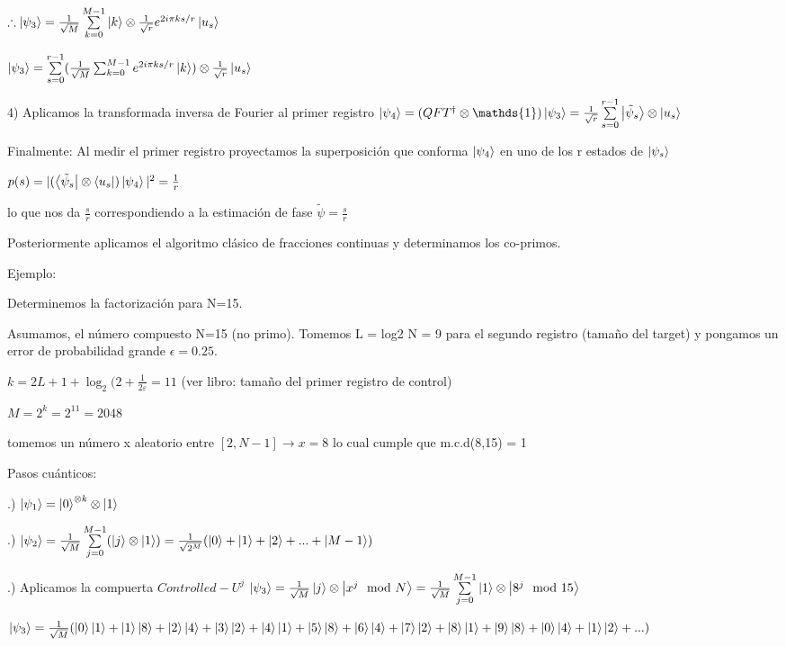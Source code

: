 $\therefore \ket{\psi_3} = \frac{1}{\sqrt{M}} \sum\limits_{k=0}^{M-1} \ket{k} \otimes \frac{1}{\sqrt{r}} e^{2 i \pi k s/r} \ket{u_s}$

$\ket{\psi_3} = \sum\limits_{s=0}^{r-1} (\frac{1}{\sqrt{M}} \sum_{k=0}^{M-1} e^{2 i \pi k s/r} \ket{k}) \otimes \frac{1}{\sqrt{r}} \ket{u_s}$

4) Aplicamos la transformada inversa de Fourier al primer registro $\ket{\psi_4} = (QFT^\dagger \otimes \mathds{1}) \ket{\psi_3} = \frac{1}{\sqrt{r}} \sum\limits_{s=0}^{r-1} \ket{\tilde{\psi}_s} \otimes \ket{u_s}$

Finalmente: Al medir el primer registro proyectamos la superposición que conforma $\ket{\psi_4}$ en uno de los r estados de $\ket{\psi_s}$

$p(s) = |(\bra{\tilde{\psi}_s} \otimes \bra{u_s}) \ket{\psi_4}|^2 = \frac{1}{r}$

lo que nos da $\frac{s}{r}$ correspondiendo a la estimación de fase $\tilde{\psi} = \frac{s}{r}$

Posteriormente aplicamos el algoritmo clásico de fracciones continuas y determinamos los co-primos.

Ejemplo:

Determinemos la factorización para N=15.

Asumamos, el número compuesto N=15 (no primo). Tomemos L = log2 N = 9 para el segundo registro (tamaño del target) y pongamos un error de probabilidad grande $\epsilon = 0.25$.

$k = 2L + 1 + \log_2(2 + \frac{1}{2 \varepsilon} = 11$ (ver libro: tamaño del primer registro de control)

$M = 2^k = 2^{11} = 2048$

tomemos un número x aleatorio entre $[2, N-1] \rightarrow x = 8$ lo cual cumple que m.c.d(8,15) = 1

Pasos cuánticos:

.) $\ket{\psi_1} = \ket{0}^{\otimes k} \otimes \ket{1}$

.) $\ket{\psi_2} = \frac{1}{\sqrt{M}} \sum\limits_{j=0}^{M-1} (\ket{j} \otimes \ket{1}) = \frac{1}{\sqrt{2^M}} (\ket{0} + \ket{1} + \ket{2} + ... + \ket{M-1})$

.) Aplicamos la compuerta $Controlled-U^j$ $\ket{\psi_3} = \frac{1}{\sqrt{M}} \ket{j} \otimes \ket{x^j \mod N} = \frac{1}{\sqrt{M}} \sum\limits_{j=0}^{M-1} \ket{1} \otimes \ket{8^j \mod 15}$

$\ket{\psi_3} = \frac{1}{\sqrt{M}} (\ket{0}\ket{1} + \ket{1}\ket{8} + \ket{2}\ket{4} + \ket{3}\ket{2} + \ket{4}\ket{1} + \ket{5}\ket{8} + \ket{6}\ket{4} + \ket{7}\ket{2} + \ket{8}\ket{1} + \ket{9}\ket{8} + \ket{0}\ket{4} + \ket{1}\ket{2} + ...)$

